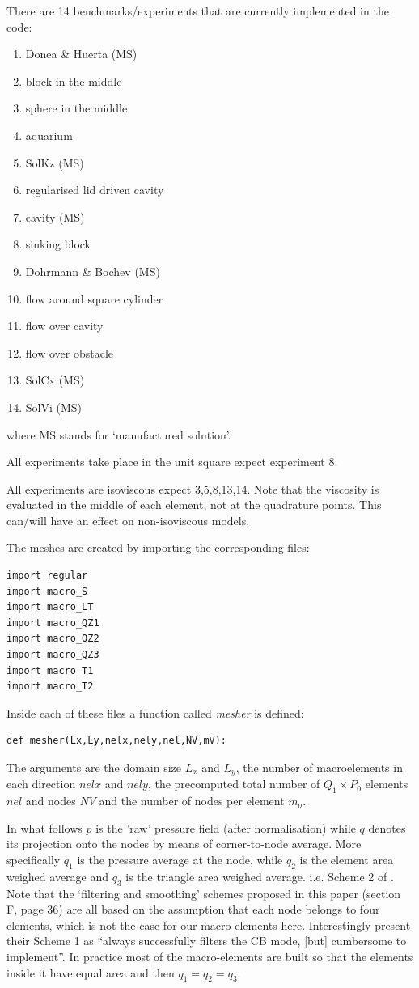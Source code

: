 There are 14 benchmarks/experiments that are currently implemented in the code:
\begin{enumerate}
\item Donea \& Huerta (MS) %
\item block in the middle %
\item sphere in the middle %
\item aquarium %
\item SolKz (MS) %
\item regularised lid driven cavity %
\item cavity (MS) %
\item sinking block %
\item Dohrmann \& Bochev (MS) \cite{dobo04} %
\item flow around square cylinder %
\item flow over cavity %
\item flow over obstacle %
\item SolCx (MS) %
\item SolVi (MS) %
\end{enumerate}
where MS stands for `manufactured solution'.

All experiments take place in the unit square expect experiment 8.

All experiments are isoviscous expect 3,5,8,13,14.
Note that the viscosity is evaluated in the middle of each element, not 
at the quadrature points. This can/will have an effect on non-isoviscous models.

\newpage
The meshes are created by importing the corresponding files:
\begin{lstlisting} 
import regular
import macro_S
import macro_LT
import macro_QZ1 
import macro_QZ2
import macro_QZ3
import macro_T1
import macro_T2
\end{lstlisting} 
Inside each of these files a function called {\sl mesher} is defined: 
\begin{lstlisting} 
def mesher(Lx,Ly,nelx,nely,nel,NV,mV):
\end{lstlisting} 
The arguments are the domain size $L_x$ and $L_y$, the number of macroelements
in each direction $nelx$ and $nely$, the precomputed total number of $Q_1\times P_0$ 
elements $nel$ and nodes $NV$ and the number of nodes per element $m_\upnu$.  

In what follows $p$ is the 'raw' pressure field (after normalisation)
while $q$ denotes its projection onto the nodes by means of corner-to-node average.
More specifically $q_1$ is the pressure average at the node, 
while $q_2$ is the element area weighed average
and $q_3$ is the triangle area weighed average. i.e. Scheme 2 of \cite{sagl81a}.
Note that the `filtering and smoothing' schemes proposed in this paper (section F, page 36)
are all based on the assumption
that each node belongs to four elements, which is not the case for our macro-elements here.
Interestingly \textcite{sagl81a} present their Scheme 1 as ``always successfully filters the 
CB mode, [but] cumbersome to implement''.
In practice most of the macro-elements are built so that 
the elements inside it have equal area and then $q_1=q_2=q_3$. 

